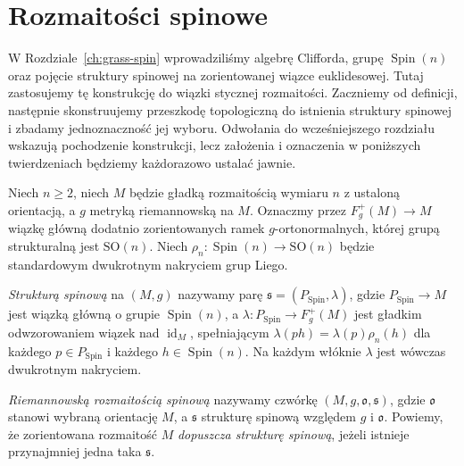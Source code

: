 



\section{Rozmaitości spinowe}
\label{sec:rozmaitosci-spinowe}

W Rozdziale~\ref{ch:grass-spin} wprowadziliśmy algebrę Clifforda,
grupę $\operatorname{Spin}(n)$ oraz pojęcie struktury spinowej
na zorientowanej wiązce euklidesowej. Tutaj zastosujemy tę konstrukcję
do wiązki stycznej rozmaitości. Zaczniemy od definicji, następnie
skonstruujemy przeszkodę topologiczną do istnienia struktury spinowej
i zbadamy jednoznaczność jej wyboru. Odwołania do wcześniejszego
rozdziału wskazują pochodzenie konstrukcji, lecz założenia i oznaczenia
w poniższych twierdzeniach będziemy każdorazowo ustalać jawnie.

\begin{definicja}
\label{def:rozmaitosc-spinowa}
Niech $n\geq2$, niech $M$ będzie gładką rozmaitością wymiaru $n$
z ustaloną orientacją, a $g$ metryką riemannowską na $M$.
Oznaczmy przez $F^+_g(M)\to M$ wiązkę główną dodatnio
zorientowanych ramek $g$-ortonormalnych, której grupą
strukturalną jest $\mathrm{SO}(n)$. Niech
$\rho_n:\operatorname{Spin}(n)\to\mathrm{SO}(n)$
będzie standardowym dwukrotnym nakryciem grup Liego.

\emph{Strukturą spinową} na $(M,g)$ nazywamy parę
$\mathfrak s=(P_{\mathrm{Spin}},\lambda)$, gdzie
$P_{\mathrm{Spin}}\to M$ jest wiązką główną o grupie
$\operatorname{Spin}(n)$, a
$\lambda:P_{\mathrm{Spin}}\to F^+_g(M)$ jest gładkim
odwzorowaniem wiązek nad $\operatorname{id}_M$, spełniającym
$\lambda(ph)=\lambda(p)\rho_n(h)$ dla każdego
$p\in P_{\mathrm{Spin}}$ i każdego $h\in\operatorname{Spin}(n)$.
Na każdym włóknie $\lambda$ jest wówczas dwukrotnym nakryciem.

\emph{Riemannowską rozmaitością spinową} nazywamy czwórkę
$(M,g,\mathfrak o,\mathfrak s)$, gdzie $\mathfrak o$
stanowi wybraną orientację $M$, a $\mathfrak s$ strukturę
spinową względem $g$ i $\mathfrak o$. Powiemy, że
zorientowana rozmaitość $M$ \emph{dopuszcza strukturę spinową},
jeżeli istnieje przynajmniej jedna taka $\mathfrak s$.
\end{definicja}

